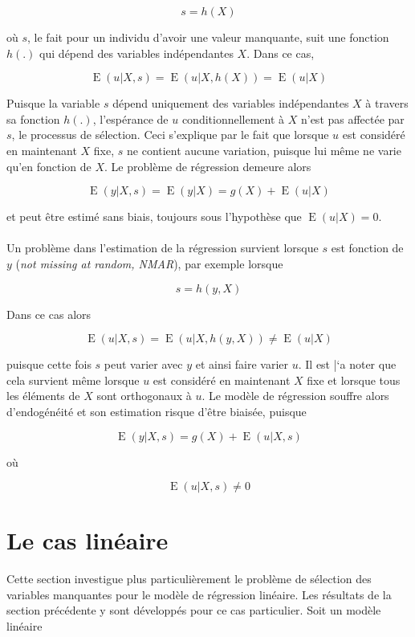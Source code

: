 \documentclass{article}
\DeclareMathOperator{\esp}{E}
\begin{document}
\[s=h(X)\]

o\`{u} $s$, le fait pour un individu d'avoir une valeur manquante, suit une fonction $h(.)$ qui d\'{e}pend des variables ind\'{e}pendantes $X$. Dans ce cas,

\[\esp(u|X,s)=\esp(u|X,h(X))=\esp(u|X)\]

Puisque la variable $s$ d\'{e}pend uniquement des variables ind\'{e}pendantes $X$ \`{a} travers sa fonction $h(.)$, l'esp\'{e}rance de $u$ conditionnellement \`{a} $X$ n'est pas affect\'{e}e par $s$, le processus de s\'{e}lection. Ceci s'explique par le fait que lorsque $u$ est consid\'{e}r\'{e} en maintenant $X$ fixe, $s$ ne contient aucune variation, puisque lui m\^eme ne varie qu'en fonction de $X$. Le probl\`{e}me de r\'{e}gression demeure alors

\[\esp(y|X,s)=\esp(y|X)=g(X)+\esp(u|X)\]

et peut \^{e}tre estim\'{e} sans biais, toujours sous l'hypoth\`{e}se que $\esp(u|X)=0$.
\\
\\
Un probl\`{e}me dans l'estimation de la r\'{e}gression survient lorsque $s$ est fonction de $y$ (\textit{not missing at random, NMAR}), par exemple lorsque

\[s=h(y,X)\]

Dans ce cas alors

\[\esp(u|X,s)=\esp(u|X,h(y,X))\neq\esp(u|X)\]

puisque cette fois $s$ peut varier avec $y$ et ainsi faire varier $u$. Il est |`{a} noter que cela survient m\^{e}me lorsque $u$ est consid\'{e}r\'{e} en maintenant $X$ fixe et lorsque tous les \'{e}l\'{e}ments de $X$ sont orthogonaux \`{a} $u$. Le mod\`{e}le de r\'{e}gression souffre alors d'endog\'{e}n\'{e}it\'{e} et son estimation risque d'\^{e}tre biais\'{e}e, puisque

\[\esp(y|X,s)=g(X)+\esp(u|X,s)\]

o\`{u}

\[\esp(u|X,s)\neq0\]


\section{Le cas lin\'{e}aire}
Cette section investigue plus particuli\`{e}rement le probl\`{e}me de s\'{e}lection des variables manquantes pour le mod\`{e}le de r\'{e}gression lin\'{e}aire. Les r\'{e}sultats de la section pr\'{e}c\'{e}dente y sont d\'{e}velopp\'{e}s pour ce cas particulier. Soit un mod\`{e}le lin\'{e}aire
\end{document}
